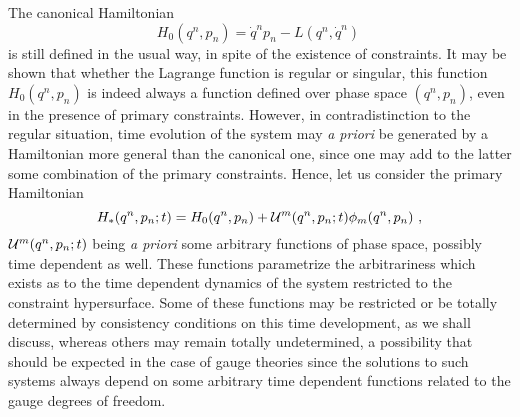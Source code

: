 \documentclass[a4paper,11pt]{article}
\begin{document}
The canonical Hamiltonian
\begin{equation}
H_0(q^n,p_n)=\dot{q}^np_n-L(q^n,\dot{q}^n)\ 
\end{equation}
is still defined in the usual way, in spite of the existence of constraints.
It may be shown that whether the Lagrange function is regular
or singular, this function $H_0(q^n,p_n)$ is indeed always a function
defined over phase space $(q^n,p_n)$, even in the presence of primary 
constraints. However, in contradistinction to the regular situation,
time evolution of the system may {\sl a priori\/} be generated by a 
Hamiltonian more general than the canonical one, since one may add to the
latter some combination of the primary constraints. Hence, let us
consider the primary Hamiltonian
\begin{equation}
H_*(q^n,p_n;t)=H_0(q^n,p_n)+{\cal U}^m(q^n,p_n;t)\phi_m(q^n,p_n)\ ,
\end{equation}
${\cal U}^m(q^n,p_n;t)$ being {\sl a priori\/} some arbitrary functions
of phase space, possibly time dependent as well. These functions parametrize
the arbitrariness which exists as to the time dependent dynamics of the
system restricted to the constraint hypersurface. Some of these functions
may be restricted or be totally determined by consistency conditions on this
time development, as we shall discuss, whereas others may remain totally
undetermined, a possibility that should be expected in the case of
gauge theories since the solutions to such systems always depend on
some arbitrary time dependent functions related to the gauge degrees
of freedom.
\end{document}
